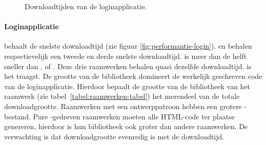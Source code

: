 \begin{figure}
  \centering
  \quad
  \caption{Downloadtijden van de loginapplicatie.}
  \label{fig:performantie-login-boxplot}
\end{figure}

\paragraph{Loginapplicatie}
\lungo{} behaalt de snelste downloadtijd (zie figuur \ref{fig:performantie-login}).
\jqm{} en \kendo{} behalen respectievelijk een tweede en derde snelste downloadtijd.
\lungo{} is meer dan de helft sneller dan \jqm{}, \kendo{} of \st{}.
Deze drie raamwerken behalen quasi dezelfde downloadtijd.
\st{} is het traagst.
De grootte van de bibliotheek domineert de werkelijk geschreven code van de loginapplicatie.
Hierdoor bepaalt de grootte van de bibliotheek van het raamwerk (zie tabel~\ref{tabel:raamwerken-tabel}) het merendeel van de totale downloadgrootte.
Raamwerken met een ontwerppatroon hebben een grotere \js{}-bestand.
Pure \js{}-gedreven raamwerken moeten alle HTML-code ter plaatse genereren, hierdoor is hun bibliotheek ook groter dan andere raamwerken.
De verwachting is dat downloadgrootte evenredig is met de downloadtijd.

